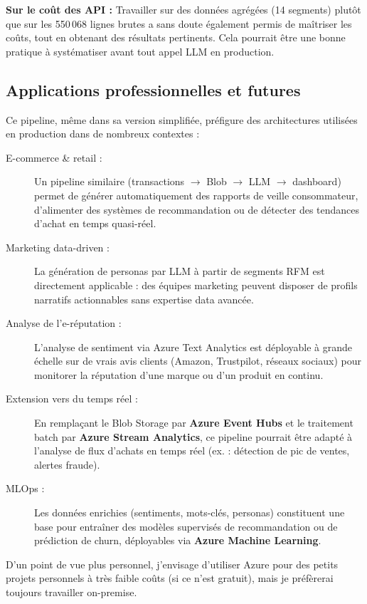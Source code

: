 \documentclass[12pt, a4paper]{article}
\begin{document}
\textbf{Sur le coût des API :} Travailler sur des données agrégées (14 segments) plutôt que sur les 550\,068 lignes brutes a sans doute également permis de maîtriser les coûts, tout en obtenant des résultats pertinents. Cela pourrait être une bonne pratique à systématiser avant tout appel LLM en production.

\subsection{Applications professionnelles et futures}

Ce pipeline, même dans sa version simplifiée, préfigure des architectures utilisées en production dans de nombreux contextes :

\begin{description}
  \item[E-commerce \& retail :] Un pipeline similaire (transactions $\to$ Blob $\to$ LLM $\to$ dashboard) permet de générer automatiquement des rapports de veille consommateur, d'alimenter des systèmes de recommandation ou de détecter des tendances d'achat en temps quasi-réel.

  \item[Marketing data-driven :] La génération de personas par LLM à partir de segments RFM est directement applicable : des équipes marketing peuvent disposer de profils narratifs actionnables sans expertise data avancée.

  \item[Analyse de l'e-réputation :] L'analyse de sentiment via Azure Text Analytics est déployable à grande échelle sur de vrais avis clients (Amazon, Trustpilot, réseaux sociaux) pour monitorer la réputation d'une marque ou d'un produit en continu.

  \item[Extension vers du temps réel :] En remplaçant le Blob Storage par \textbf{Azure Event Hubs} et le traitement batch par \textbf{Azure Stream Analytics}, ce pipeline pourrait être adapté à l'analyse de flux d'achats en temps réel (ex. : détection de pic de ventes, alertes fraude).

  \item[MLOps :] Les données enrichies (sentiments, mots-clés, personas) constituent une base pour entraîner des modèles supervisés de recommandation ou de prédiction de churn, déployables via \textbf{Azure Machine Learning}.
\end{description}

D'un point de vue plus personnel, j'envisage d'utiliser Azure pour des petits projets personnels à très faible coûts (si ce n'est gratuit), mais je préfèrerai toujours travailler on-premise.
\end{document}
